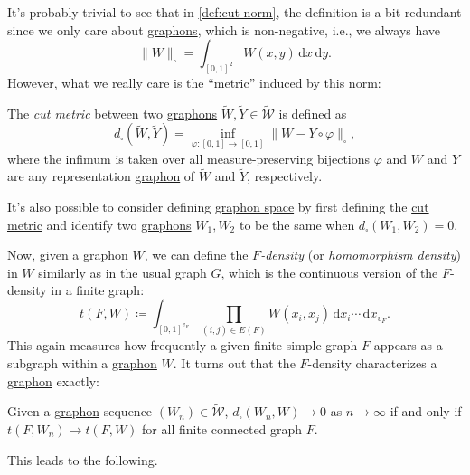 It's probably trivial to see that in \autoref{def:cut-norm}, the definition is a bit redundant since we only care about \hyperref[def:graphon]{graphons}, which is non-negative, i.e., we always have
\[
	\lVert W \rVert _{\square }
	= \int_{[0, 1]^2} W(x, y) \,\mathrm{d}x \,\mathrm{d} y.
\]
However, what we really care is the ``metric'' induced by this norm:

\begin{definition}\label{def:cut-metric}
	The \emph{cut metric} between two \hyperref[def:graphon]{graphons} \(\widetilde{W} , \widetilde{Y} \in \widetilde{\mathcal{W} } \) is defined as
	\[
		d_{\square}(\widetilde{W} , \widetilde{Y} ) = \inf _{\varphi \colon [0, 1] \to [0, 1]} \lVert W - Y \circ \varphi \rVert _{\square},
	\]
	where the infimum is taken over all measure-preserving bijections \(\varphi \) and \(W\) and \(Y\) are any representation \hyperref[def:graphon]{graphon} of \(\widetilde{W} \) and \(\widetilde{Y} \), respectively.
\end{definition}

\begin{remark}
	It's also possible to consider defining \hyperref[def:graphon-space]{graphon space} by first defining the \hyperref[def:cut-metric]{cut metric} and identify two \hyperref[def:graphon]{graphons} \(W_1, W_2\) to be the same when \(d_{\square }(W_1 , W_2) = 0\).
\end{remark}

Now, given a \hyperref[def:graphon]{graphon} \(W\), we can define the \emph{\(F\)-density} (or \emph{homomorphism density}) in \(W\) similarly as in the usual graph \(G\), which is the continuous version of the \(F\)-density in a finite graph:
\[
	t(F, W)
	\coloneqq \int_{[0, 1]^{v_F}} \prod_{(i, j) \in E(F)} W(x_i, x_j) \,\mathrm{d} x_i \cdots \,\mathrm{d} x_{v_F}.
\]
This again measures how frequently a given finite simple graph \(F\) appears as a subgraph within a \hyperref[def:graphon]{graphon} \(W\). It turns out that the \(F\)-density characterizes a \hyperref[def:graphon]{graphon} exactly:

\begin{theorem}\label{thm:graphon-convergence}
	Given a \hyperref[def:graphon]{graphon} sequence \((W_n) \in \widetilde{\mathcal{W}} \), \(d_{\square}(W_n, W) \to 0\) as \(n \to \infty \) if and only if \(t(F, W_n) \to t(F, W)\) for all finite connected graph \(F\).
\end{theorem}

This leads to the following.

